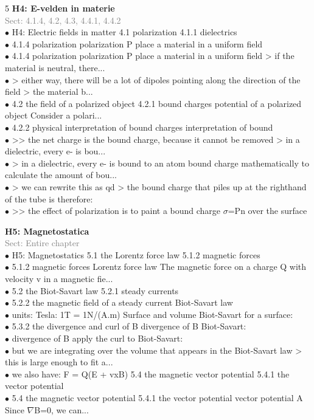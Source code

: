 \documentclass[7pt,a4paper]{article}
\begin{document}
\begin{multicols*}{5}
\textbf{H4: E-velden in materie}\\\textcolor{gray}{{Sect: 4.1.4, 4.2, 4.3, 4.4.1, 4.4.2}}\\\vspace{0.5pt}
$\bullet$ H4: Electric fields in matter 
4.1 polarization 
4.1.1 dielectrics\\
$\bullet$ 4.1.4 polarization 
polarization P place a material in a uniform field\\
$\bullet$ 4.1.4 polarization 
polarization P place a material in a uniform field 
> if the material is neutral, there...\\
$\bullet$ > either way, there will be a lot of dipoles pointing along the direction of the field  
  > the material b...\\
$\bullet$ 4.2 the field of a polarized object 
4.2.1 bound charges 
potential of a polarized object Consider a polari...\\
$\bullet$ 4.2.2 physical interpretation of bound charges 
interpretation of bound\\
$\bullet$ >> the net charge is the bound charge, because it cannot be removed 
    > in a dielectric, every e- is bou...\\
$\bullet$ > in a dielectric, every e- is bound to an atom 
bound charge mathematically to calculate the amount of bou...\\
$\bullet$ > we can rewrite this as qd 
  > the bound charge that piles up at the righthand of the tube is therefore:\\
$\bullet$ >> the effect of polarization is to paint a bound charge $\sigma$=Pn over the surface\\
\columnbreak

\textbf{H5: Magnetostatica}\\\textcolor{gray}{{Sect: Entire chapter}}\\\vspace{0.5pt}
$\bullet$ H5: Magnetostatics 
5.1 the Lorentz force law 
5.1.2 magnetic forces\\
$\bullet$ 5.1.2 magnetic forces 
Lorentz force law The magnetic force on a charge Q with velocity v in a magnetic fie...\\
$\bullet$ 5.2 the Biot-Savart law 
5.2.1 steady currents\\
$\bullet$ 5.2.2 the magnetic field of a steady current 
Biot-Savart law\\
$\bullet$ units: Tesla: 1T = 1N/(A.m) 
Surface and volume Biot-Savart for a surface:\\
$\bullet$ 5.3.2 the divergence and curl of B 
divergence of B  Biot-Savart:\\
$\bullet$ divergence of B apply the curl to Biot-Savart:\\
$\bullet$ but we are integrating over the volume that appears in the Biot-Savart law 
> this is large enough to fit a...\\
$\bullet$ we also have: F = Q(E + vxB) 
5.4 the magnetic vector potential 
5.4.1 the vector potential\\
$\bullet$ 5.4 the magnetic vector potential 
5.4.1 the vector potential 
vector potential A Since $\nabla$B=0, we can...\\
\columnbreak


\end{multicols*}
\end{document}

